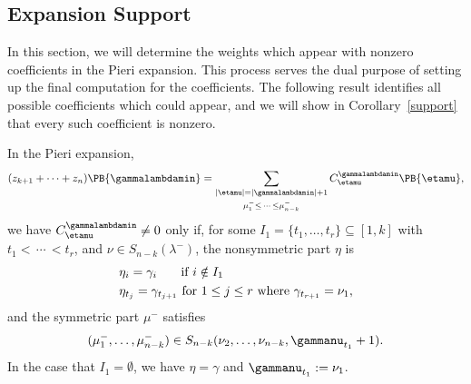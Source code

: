     \subsection{Expansion Support}
In this section, we will determine the weights which appear with nonzero coefficients in the Pieri expansion. This process serves the dual purpose of setting up the final computation for the coefficients. The following result identifies all possible coefficients which could appear, and we will show in Corollary~\ref{support} that every such coefficient is nonzero.
\begin{prop}\label{expansion}
In the Pieri expansion,
\[ (z_{k+1} + \dots + z_n)\PB{\gammalambdamin} = \sum_{\substack{|\etamu| = |\gammalambdamin| + 1 \\[1mm] \mu^-_1 \leq \, \dotsm \, \leq \mu^-_{n-k} }} C^{\gammalambdamin}_{\etamu} \PB{\etamu}, \]
we have $C^{\gammalambdamin}_{\etamu}\neq 0$ only if, for some $I_1=\{t_1, \dots, t_r\} \subseteq [1,k]$ with $t_1 < \, \dotsm \, < t_r$, and $\nu \in S_{n-k}(\lambda^-)$, the nonsymmetric part $\eta$ is
\begin{align*}
    &\eta_i = \gamma_i \hspace*{.55cm}\text{ if } i\notin I_1\\
    &\eta_{t_j}=\gamma_{t_{j+1}} \text{ for } 1\leq j \leq r \text{ where } \gamma_{t_{r+1}} = \nu_1,
\end{align*}
and the symmetric part $\mu^-$ satisfies
\begin{align*}
    (\mu_1^-, \dotsc, \mu_{n-k}^- ) \in S_{n-k}(\nu_2, \dotsc, \nu_{n-k}, \gammanu_{t_1}+1).
\end{align*}
In the case that $I_1 = \emptyset$, we have $\eta = \gamma$ and $\gammanu_{t_1} := \nu_1$.
\end{prop}
